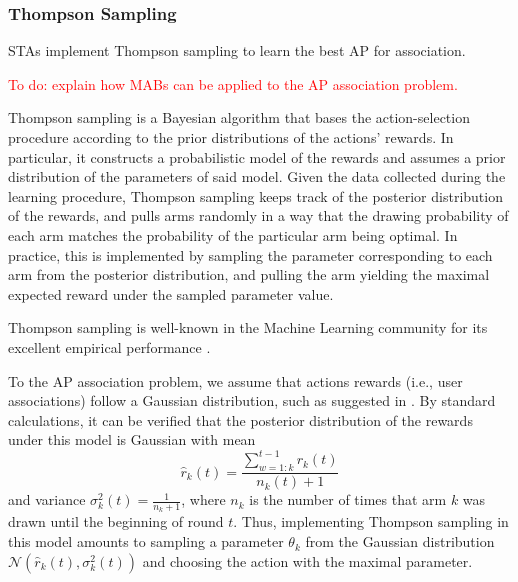 \documentclass{article}
\begin{document}
		\subsubsection{Thompson Sampling}
		\label{section:thompson}
			STAs implement Thompson sampling to learn the best AP for association. 
			
			\textcolor{red}{To do: explain how MABs can be applied to the AP association problem.}	
			
			Thompson sampling \cite{thompson1933likelihood} is a Bayesian algorithm that bases the action-selection procedure according to the prior distributions of the actions' rewards. In particular, it constructs a probabilistic model of the rewards and assumes a prior distribution of the parameters of said model. Given the data collected during the learning procedure, Thompson sampling keeps track of the posterior distribution of the rewards, and pulls arms randomly in a way that the drawing probability of each arm matches the probability of the particular arm being optimal. In practice, this is implemented by sampling the parameter corresponding to each arm from the posterior distribution, and pulling the arm yielding the maximal expected reward under the sampled parameter value.
					
			Thompson sampling is well-known in the Machine Learning community for its excellent empirical performance \cite{CL11}. 
			 
			To the AP association problem, we assume that actions rewards (i.e., user associations) follow a Gaussian distribution, such as suggested in \cite{agrawal2013further}. By standard calculations, it can be verified that the posterior distribution of the rewards under this model is Gaussian with mean 
			\begin{equation}
				\hat{r}_k(t) = \frac{\sum_{w=1:k}^{t-1} r_k(t) }{n_k(t) + 1}
				\nonumber
			\end{equation}
			and variance $\sigma_k^2(t) = \frac{1}{n_k + 1}$, where $n_k$ is the number of times that arm $k$ was drawn until the beginning of round $t$. Thus, implementing Thompson sampling in this model amounts to sampling a parameter $\theta_k$ from the Gaussian distribution $\mathcal{N}\left(\hat{r}_k(t),\sigma_k^2(t)\right)$ and choosing the action with the maximal parameter.   
			
\end{document}

